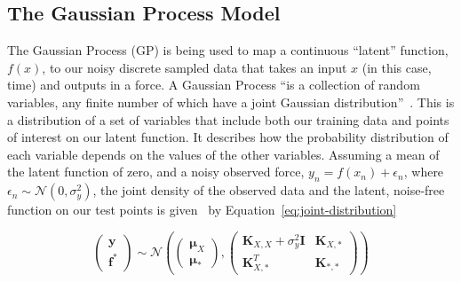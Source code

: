 \documentclass[12pt]{article}
\begin{document}
    \subsection{The Gaussian Process Model}
    The Gaussian Process (GP) is being used to map a continuous ``latent'' function, $f(x)$, to our noisy discrete sampled data that takes an input $x$ (in this case, time) and outputs in a force.
    A Gaussian Process ``is a collection of random variables, any finite number of which have a joint Gaussian distribution''~\cite{rasmussen2006gaussian}.
    This is a distribution of a set of variables that include both our training data and points of interest on our latent function.
    It describes how the probability distribution of each variable depends on the values of the other variables.
    Assuming a mean of the latent function of zero, and a noisy observed force, $y_n = f(x_n)+\epsilon_n$, where $\epsilon_n \sim \mathcal{N}(0, \sigma^2_y)$, the joint density of the observed data and the latent, noise-free function on our test points is given~\cite{murphy2023probabilistic} by Equation~\ref{eq:joint-distribution}

    \begin{equation}
        \begin{pmatrix}
            \mathbf{y} \\
            \mathbf{f}^*
        \end{pmatrix}
        \sim \mathcal{N} \left(
        \begin{pmatrix}
            \boldsymbol{\mu}_X \\
            \boldsymbol{\mu}_*
        \end{pmatrix},
        \begin{pmatrix}
            \mathbf{K}_{X,X} + \sigma^2_y \mathbf{I} & \mathbf{K}_{X,*} \\
            \mathbf{K}_{X,*}^T & \mathbf{K}_{*,*}
        \end{pmatrix}
        \right)\label{eq:joint-distribution}
    \end{equation}
\end{document}

